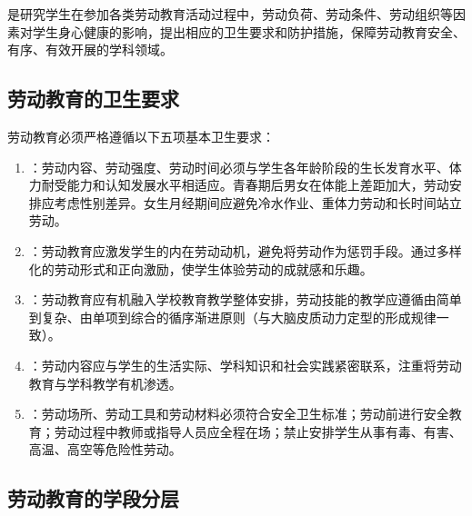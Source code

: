 是研究学生在参加各类劳动教育活动过程中，劳动负荷、劳动条件、劳动组织等因素对学生身心健康的影响，提出相应的卫生要求和防护措施，保障劳动教育安全、有序、有效开展的学科领域。

\subsection{劳动教育的卫生要求}

\begin{keybox}
劳动教育必须严格遵循以下五项基本卫生要求：

\begin{enumerate}[leftmargin=*]
    \item {}：劳动内容、劳动强度、劳动时间必须与学生各年龄阶段的生长发育水平、体力耐受能力和认知发展水平相适应。青春期后男女在体能上差距加大，劳动安排应考虑性别差异。女生月经期间应避免冷水作业、重体力劳动和长时间站立劳动。
    \item {}：劳动教育应激发学生的内在劳动动机，避免将劳动作为惩罚手段。通过多样化的劳动形式和正向激励，使学生体验劳动的成就感和乐趣。
    \item {}：劳动教育应有机融入学校教育教学整体安排，劳动技能的教学应遵循由简单到复杂、由单项到综合的循序渐进原则（与大脑皮质动力定型的形成规律一致）。
    \item {}：劳动内容应与学生的生活实际、学科知识和社会实践紧密联系，注重将劳动教育与学科教学有机渗透。
    \item {}：劳动场所、劳动工具和劳动材料必须符合安全卫生标准；劳动前进行安全教育；劳动过程中教师或指导人员应全程在场；禁止安排学生从事有毒、有害、高温、高空等危险性劳动。
\end{enumerate}
\end{keybox}

\subsection{劳动教育的学段分层}

